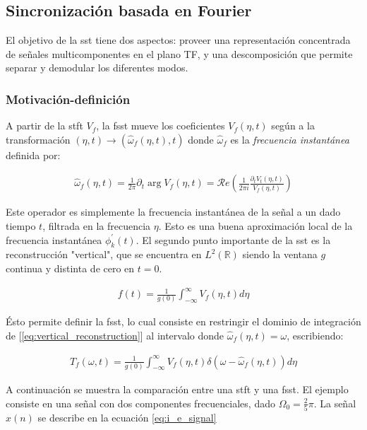 \subsection*{Sincronización basada en Fourier}

\indent El objetivo de la \gls{sst} tiene dos aspectos: proveer una representación concentrada de señales
multicomponentes en el plano TF, y una descomposición que permite separar y demodular los diferentes modos.

\subsubsection*{Motivación-definición}

\indent A partir de la \gls{stft} $V_f$, la \gls{fsst} mueve los coeficientes $V_f(\eta,t)$ según a la
transformación $(\eta,t) \rightarrow (\hat{\omega}_f(\eta,t),t)$ donde $\hat{\omega}_f$ es la \textit{frecuencia
instantánea} definida por:

\begin{align}
  \hat{\omega}_f(\eta,t) = \frac{1}{2\pi} \partial_t \arg V_f(\eta,t) = \mathcal{R}e\left(\frac{1}{2\pi
  i}\frac{\partial_t V_t(\eta,t)}{V_f(\eta,t)}\right)
\end{align}

\indent Este operador es simplemente la frecuencia instantánea de la señal a un dado tiempo $t$, filtrada en la
frecuencia $\eta$. Esto es una buena aproximación local de la frecuencia instantánea $\phi_k^{'}(t)$. El segundo
punto importante de la \gls{sst} es la reconstrucción "vertical", que se encuentra en $L^2(\mathbb{R})$ siendo
la ventana $g$ continua y distinta de cero en $t=0$.

\begin{align} \label{eq:vertical_reconstruction}
  f(t) = \frac{1}{g(0)} \int_{-\infty}^\infty V_f(\eta,t)d\eta
\end{align}

\indent Ésto permite definir la \gls{fsst}, lo cual consiste en restringir el dominio de integración de
[\ref{eq:vertical_reconstruction}] al intervalo donde $\hat{\omega}_f(\eta,t) = \omega$, escribiendo:

\begin{align}
  T_f(\omega,t) = \frac{1}{g(0)} \int_{-\infty}^\infty V_f(\eta,t)\delta(\omega-\hat{\omega}_f(\eta,t))d\eta
\end{align}

\indent A continuación se muestra la comparación entre una \gls{stft} y una \gls{fsst}. El ejemplo
consiste en una señal con dos componentes frecuenciales, dado $\Omega_0=\frac{2}{5}\pi$. La señal $x(n)$ se describe
en la ecuación \ref{eq:i_e_signal}

